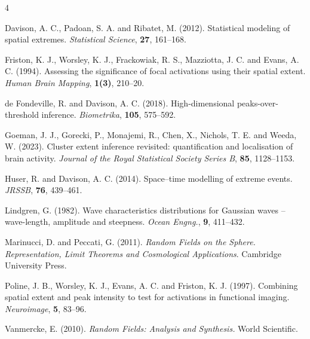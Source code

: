 \documentclass[aap,preprint]{imsart}
\theoremstyle{plain}
\theoremstyle{definition}
\begin{document}
\begin{thebibliography}{4}
		
		Davison, A. C., Padoan, S. A. and Ribatet, M. (2012). Statistical modeling of spatial extremes. \emph{Statistical Science}, {\bf 27}, 161--168.
		
		
		Friston, K. J.,  Worsley, K. J., Frackowiak, R. S., Mazziotta, J. C. and Evans, A. C.  (1994). Assessing the significance of focal activations using their spatial extent. \textit{Human Brain Mapping}, \textbf{1(3)}, 210--20.
		
		de Fondeville, R. and Davison, A. C. (2018). High-dimensional peaks-over-threshold inference. \textit{Biometrika}, \textbf{105}, 575--592.
		
		Goeman, J. J., Gorecki, P., Monajemi, R., Chen, X., Nichols, T. E. and Weeda, W. (2023). Cluster extent inference revisited: quantification and localisation of brain activity. \textit{Journal of the Royal Statistical Society Series B}, \textbf{85}, 1128--1153.
		
		Huser, R. and Davison, A. C. (2014). Space–time modelling of extreme events. \textit{JRSSB}, \textbf{76}, 439--461.
		
		Lindgren, G. (1982). Wave characteristics distributions for Gaussian waves -- wave-length, amplitude and steepness. {\it Ocean Engng.}, {\bf 9},  411--432.
		
		Marinucci, D. and Peccati, G. (2011). {\it Random Fields on the Sphere. Representation, Limit Theorems and Cosmological Applications}. Cambridge University Press.
		
		Poline, J. B., Worsley, K. J., Evans, A. C. and Friston, K. J. (1997). Combining spatial extent and peak intensity to test for activations in functional imaging. \emph{Neuroimage}, {\bf 5}, 83--96.
		
		Vanmercke, E. (2010). \textit{Random Fields: Analysis and Synthesis.} World Scientific.
		

\end{thebibliography}
\end{document}
